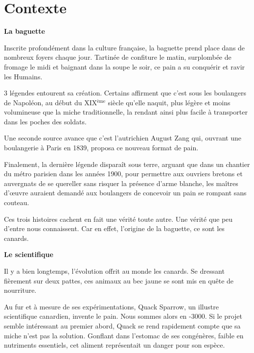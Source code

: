 
\section{Contexte} %


\textbf{\large La baguette}


Inscrite profondément dans la culture française, la baguette prend
place dans de nombreux foyers chaque jour. Tartinée de confiture le
matin, surplombée de fromage le midi et baignant dans la soupe le soir,
ce pain a su conquérir et ravir les Humains.


3 légendes entourent sa création. Certains affirment que c'est sous
les boulangers de Napoléon, au début du XIX$^{\text{ème}}$ siècle qu'elle naquit,
plus légère et moins volumineuse que la miche traditionnelle, la
rendant ainsi plus facile à transporter dans les poches des soldats.

Une seconde source avance que c'est l'autrichien August Zang qui,
ouvrant une boulangerie à Paris en 1839, proposa ce nouveau format
de pain.

Finalement, la dernière légende disparaît sous terre, arguant que dans
un chantier du métro parisien dans les années 1900, pour permettre
aux ouvriers bretons et auvergnats de se quereller sans risquer la
présence d'arme blanche, les maîtres d'œuvre auraient demandé aux
boulangers de concevoir un pain se rompant sans couteau.

Ces trois histoires cachent en fait une vérité toute autre. Une vérité
que peu d'entre nous connaissent. Car en effet, l'origine de la baguette,
ce sont les canards.


\textbf{\large Le scientifique}

Il y a bien longtemps, l'évolution offrit au monde les canards. Se
dressant fièrement sur deux pattes, ces animaux au bec jaune se sont mis
en quête de nourriture.

Au fur et à mesure de ses expérimentations, Quack Sparrow, un illustre
scientifique canardien, invente le pain. Nous sommes alors en -3000. Si
le projet semble intéressant au premier abord, Quack se rend rapidement
compte que sa miche n'est pas la solution. Gonflant dans l'estomac de ses
congénères, faible en nutriments essentiels, cet aliment représentait un
danger pour son espèce.

